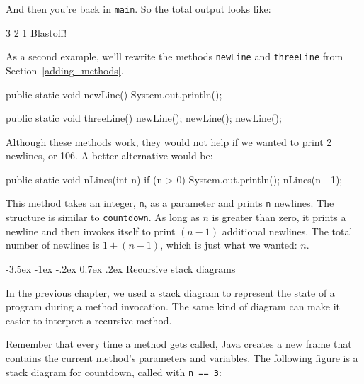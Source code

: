 \documentclass[12pt]{book}
\makeatletter
\theoremstyle{exercise}
\newcommand{\java}[1]{\verb"#1"}
\renewcommand{\section}{\@startsection{section}{1}{\z@}%
    {-3.5ex \@plus -1ex \@minus -.2ex}%
    {0.7ex \@plus.2ex}%
    {\normalfont\Large\bfseries}}
\newcommand{\java}[1]{\lstinline{#1}} %
\makeatother
\begin{document}
And then you're back in \java{main}.
So the total output looks like:

\begin{stdout}
3
2
1
Blastoff!
\end{stdout}

As a second example, we'll rewrite the methods \java{newLine} and \java{threeLine} from Section~\ref{adding_methods}.

\begin{code}
    public static void newLine() {
        System.out.println();
    }

    public static void threeLine() {
        newLine();
        newLine();
        newLine();
    }
\end{code}


Although these methods work, they would not help if we wanted to print 2 newlines, or 106.
A better alternative would be:

\begin{code}
    public static void nLines(int n) {
        if (n > 0) {
            System.out.println();
            nLines(n - 1);
        }
    }
\end{code}

This method takes an integer, \java{n}, as a parameter and prints \java{n} newlines.
The structure is similar to \java{countdown}.
As long as $n$ is greater than zero, it prints a newline and then invokes itself to print $(n-1)$ additional newlines.
The total number of newlines is $1 + (n - 1)$, which is just what we wanted: $n$.


\section{Recursive stack diagrams}


In the previous chapter, we used a stack diagram to represent the state of a program during a method invocation.
The same kind of diagram can make it easier to interpret a recursive method.

Remember that every time a method gets called, Java creates a new frame that contains the current method's parameters and variables.
The following figure is a stack diagram for countdown, called with \java{n == 3}:
\end{document}
